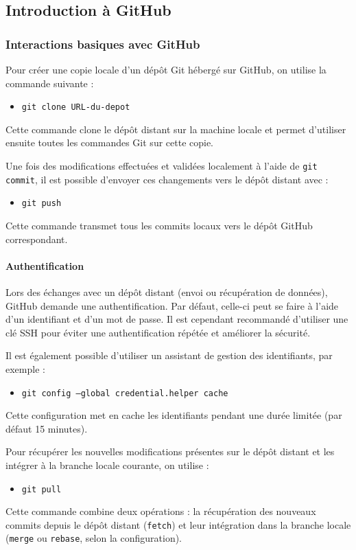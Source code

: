 \documentclass{article}
\begin{document}
\subsection{Introduction à GitHub}

\subsubsection{Interactions basiques avec GitHub}

Pour créer une copie locale d’un dépôt Git hébergé sur GitHub, on utilise la commande suivante :
\begin{itemize}
    \item \texttt{git clone URL-du-depot}
\end{itemize}
Cette commande clone le dépôt distant sur la machine locale et permet d’utiliser ensuite toutes les commandes Git sur cette copie.

Une fois des modifications effectuées et validées localement à l’aide de \texttt{git commit}, il est possible d’envoyer ces changements vers le dépôt distant avec :
\begin{itemize}
    \item \texttt{git push}
\end{itemize}
Cette commande transmet tous les commits locaux vers le dépôt GitHub correspondant.

\paragraph{Authentification}

Lors des échanges avec un dépôt distant (envoi ou récupération de données), GitHub demande une authentification. Par défaut, celle-ci peut se faire à l’aide d’un identifiant et d’un mot de passe. Il est cependant recommandé d’utiliser une clé SSH pour éviter une authentification répétée et améliorer la sécurité.

Il est également possible d’utiliser un assistant de gestion des identifiants, par exemple :
\begin{itemize}
    \item \texttt{git config --global credential.helper cache}
\end{itemize}
Cette configuration met en cache les identifiants pendant une durée limitée (par défaut 15 minutes).

Pour récupérer les nouvelles modifications présentes sur le dépôt distant et les intégrer à la branche locale courante, on utilise :
\begin{itemize}
    \item \texttt{git pull}
\end{itemize}
Cette commande combine deux opérations : la récupération des nouveaux commits depuis le dépôt distant (\texttt{fetch}) et leur intégration dans la branche locale (\texttt{merge} ou \texttt{rebase}, selon la configuration).
\end{document}
